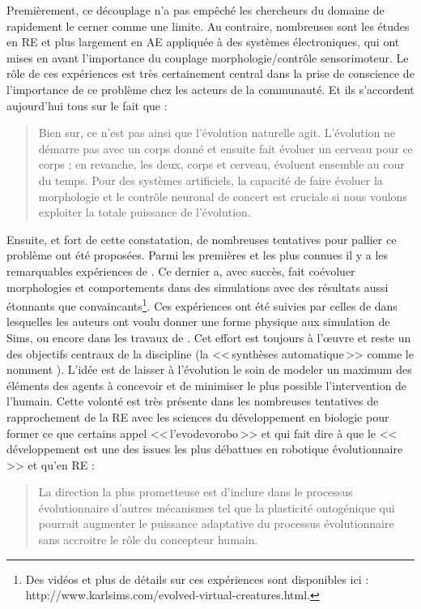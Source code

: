 Premièrement, ce découplage n'a pas empêché les chercheurs du domaine de rapidement le cerner comme une limite. Au contraire, nombreuses sont les études en RE et plus largement en AE appliquée à des systèmes électroniques, qui ont mises en avant l'importance du couplage morphologie/contrôle sensorimoteur. Le rôle de ces expériences est très certainement central dans la prise de conscience de l'importance de ce problème chez les acteurs de la communauté. Et ils s'accordent aujourd'hui tous sur le fait que :
\begin{quotation}
   Bien sur, ce n'est pas ainsi que l'évolution naturelle agit. L'évolution ne démarre pas avec un corps donné et ensuite fait évoluer un cerveau pour ce corps ; en revanche, les deux, corps et cerveau, évoluent ensemble au cour du temps. Pour des systèmes artificiels, la capacité de faire évoluer la morphologie et le contrôle neuronal de concert est cruciale si nous voulons exploiter la totale puissance de l'évolution.
   \\\citep[p. 193]{pfeifer2006howthebodyshapesthewaywethink}
\end{quotation}

Ensuite, et fort de cette constatation, de nombreuses tentatives pour pallier ce problème ont été proposées. Parmi les premières et les plus connues il y a les remarquables expériences de \cite{sims1994evolving3dmorphologyandbehaviorbycompetition}. Ce dernier a, avec succès, fait coévoluer morphologies et comportements dans des simulations avec des résultats aussi étonnants que convaincants\footnote{Des vidéos et plus de détails sur ces expériences sont disponibles ici : http://www.karlsims.com/evolved-virtual-creatures.html.}. Ces expériences ont été suivies par celles de \cite{pollack2000thegolemproject} dans lesquelles les auteurs ont voulu donner une forme physique aux simulation de Sims, ou encore dans les travaux de \citet[ch. 6]{pfeifer2006howthebodyshapesthewaywethink}.
Cet effort est toujours à l'œuvre et reste un des objectifs centraux de la discipline (la <<\,synthèses automatique\,>> comme le nomment \cite{doncieux2009exploringnewhorizonsinevolutionqryrobotics}). L'idée est de laisser à l'évolution le soin de modeler un maximum des éléments des agents à concevoir et de minimiser le plus possible l'intervention de l'humain. Cette volonté est très présente dans les nombreuses tentatives de rapprochement de la RE avec les sciences du développement en biologie pour former ce que certains appel <<\,l'evodevorobo\,>> \citep{bredeche11evolutionaryadaptationpopulationrobots} et qui fait dire à \citet[p. 17]{nolfi00evolrobobiolintetechselfmach} que le <<\,développement est une des issues les plus débattues en robotique évolutionnaire\,>> et qu'en RE :
\begin{quotation}
   La direction la plus prometteuse est d'inclure dans le processus évolutionnaire d'autres mécanismes tel que la plasticité ontogénique qui pourrait augmenter le puissance adaptative du processus évolutionnaire sans accroitre le rôle du concepteur humain.
\end{quotation}

